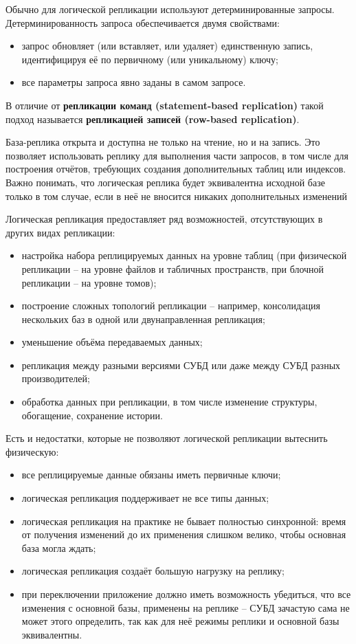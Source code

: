 Обычно для логической репликации используют детерминированные запросы. Детерминированность запроса обеспечивается двумя
свойствами:
\begin{itemize}
    \item запрос обновляет (или вставляет, или удаляет) единственную запись, идентифицируя её по первичному (или уникальному) ключу;
    \item все параметры запроса явно заданы в самом запросе.
\end{itemize}

В отличие от \textbf{репликации команд (statement-based replication)} такой подход называется \textbf{репликацией
записей (row-based replication)}.

База-реплика открыта и доступна не только на чтение, но и на запись. Это позволяет использовать реплику для выполнения
части запросов, в том числе для построения отчётов, требующих создания дополнительных таблиц или индексов. Важно
понимать, что логическая реплика будет эквивалентна исходной базе только в том случае, если в неё не вносится никаких
дополнительных изменений

Логическая репликация предоставляет ряд возможностей, отсутствующих в других видах репликации:
\begin{itemize}
    \item настройка набора реплицируемых данных на уровне таблиц (при физической репликации – на уровне файлов и табличных пространств, при блочной репликации – на уровне томов);
    \item построение сложных топологий репликации – например, консолидация нескольких баз в одной или двунаправленная репликация;
    \item уменьшение объёма передаваемых данных;
    \item репликация между разными версиями СУБД или даже между СУБД разных производителей;
    \item обработка данных при репликации, в том числе изменение структуры, обогащение, сохранение истории.
\end{itemize}

Есть и недостатки, которые не позволяют логической репликации вытеснить физическую:
\begin{itemize}
    \item все реплицируемые данные обязаны иметь первичные ключи;
    \item логическая репликация поддерживает не все типы данных;
    \item логическая репликация на практике не бывает полностью синхронной: время от получения изменений до их применения слишком велико, чтобы основная база могла ждать;
    \item логическая репликация создаёт большую нагрузку на реплику;
    \item при переключении приложение должно иметь возможность убедиться, что все изменения с основной базы, применены на реплике – СУБД зачастую сама не может этого определить, так как для неё режимы реплики и основной базы эквивалентны.
\end{itemize}


